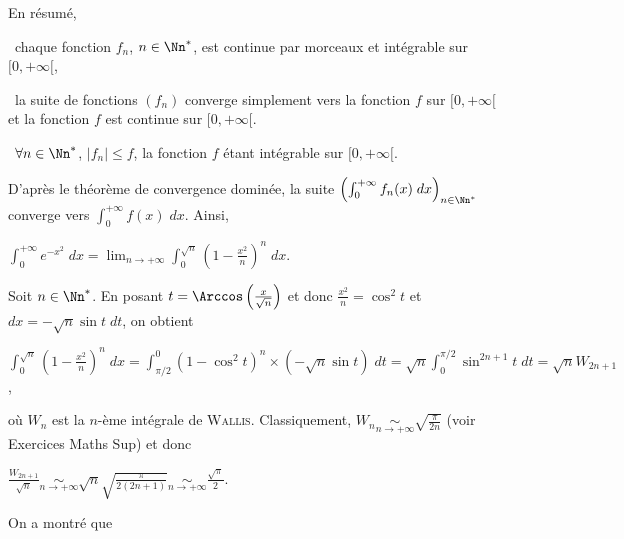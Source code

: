 {\begin{enumerate}
{En résumé,

\textbullet~chaque fonction $f_n$, $n\in\Nn^*$, est continue par morceaux et intégrable sur $[0,+\infty[$,

\textbullet~la suite de fonctions $(f_n)$ converge simplement vers la fonction $f$ sur $[0,+\infty[$ et la fonction $f$ est continue sur $[0,+\infty[$.

\textbullet~$\forall n\in\Nn^*$, $|f_n|\leqslant f$, la fonction $f$ étant intégrable sur $[0,+\infty[$.

D'après le théorème de convergence dominée, la suite $\left(\int_{0}^{+\infty}f_n(x)\;dx\right)_{n\in\Nn^*}$ converge vers $\int_{0}^{+\infty}f(x)\;dx$. Ainsi,

\begin{center}
$\int_{0}^{+\infty}e^{-x^2}\;dx=\lim_{n \rightarrow +\infty}\int_{0}^{\sqrt{n}}\left(1-\frac{x^2}{n}\right)^n\;dx$.
\end{center}

Soit $n\in\Nn^*$. En posant $t=\Arccos\left(\frac{x}{\sqrt{n}}\right)$ et donc $\frac{x^2}{n}=\cos^2t$ et $dx=-\sqrt{n}\sin t\;dt$, on obtient

\begin{center}
$\int_{0}^{\sqrt{n}}\left(1-\frac{x^2}{n}\right)^n\;dx=\int_{\pi/2}^{0}(1-\cos^2t)^n\times(-\sqrt{n}\sin t)\;dt=\sqrt{n}\int_{0}^{\pi/2}\sin^{2n+1}t\;dt=\sqrt{n}W_{2n+1}$,
\end{center}

où $W_n$ est la $n$-ème intégrale de \textsc{Wallis}. Classiquement, $W_n\underset{n\rightarrow+\infty}{\sim}\sqrt{\frac{\pi}{2n}}$ (voir Exercices Maths Sup) et donc

\begin{center}
$\frac{W_{2n+1}}{\sqrt{n}}\underset{n\rightarrow+\infty}{\sim}\sqrt{n}\sqrt{\frac{\pi}{2(2n+1)}}\underset{n\rightarrow+\infty}{\sim}\frac{\sqrt{\pi}}{2}$.
\end{center}

On a montré que

\begin{center}
\end{center}}
\end{enumerate}
}
